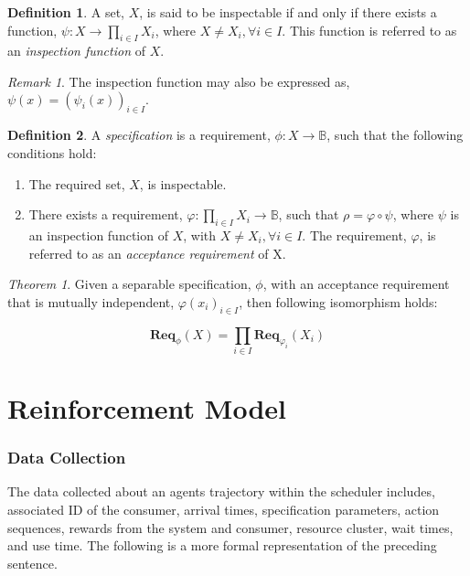 \documentclass{article}
\theoremstyle{definition}
\newtheorem{definition}{Definition}[section]
\theoremstyle{remark}
\newtheorem*{remark}{Remark}
\newtheorem*{theorem}{Theorem}
\newcommand{\func}[3]{#1:#2\rightarrow#3}
\newcommand{\reqfunc}[2]{#1:#2\rightarrow\mathbb{B}}
\newcommand{\reqop}[2]{\mathbf{Req}_{#1}(#2)}
\begin{document}
		\begin{definition}
			A set, $X$, is said to be inspectable if and only if there exists a function,
			$\func{\psi}{X}{\prod_{i \in I}{X_{i}}}$, where $X \ne X_{i}, \forall i \in I$. This function is referred to as an
			\emph{inspection function} of $X$.
		\end{definition}

		\begin{remark}
			The inspection function may also be expressed as, $\psi(x) = (\psi_{i}(x))_{i \in I}.$
		\end{remark}

		\begin{definition}
			A \emph{specification} is a requirement, $\reqfunc{\phi}{X}$, such that the following conditions
			hold:

			\begin{enumerate}
				\item The required set, $X$, is inspectable.

				\item There exists a requirement, $\reqfunc{\varphi}{\prod_{i \in I}{X_{i}}}$,
				such that $\rho = \varphi \circ \psi$, where $\psi$ is an inspection function of $X$,
				with $X \ne X_{i}, \forall i \in I$. The requirement, $\varphi$, is referred to as an
				\emph{acceptance requirement} of X.
			\end{enumerate}

		\end{definition}

		\begin{theorem}
			Given a separable specification, $\phi$, with an acceptance requirement that is mutually independent,
			$\varphi(x_i)_{i \in I}$, then following isomorphism holds:

			\[
			\reqop{\phi}{X} = \prod_{i \in I}\reqop{\varphi_{i}}{X_{i}}
			\]
		\end{theorem}

	\newpage

\part{Reinforcement Model}

	\section{Data Collection}

	The data collected about an agents trajectory within the scheduler includes, associated ID of the consumer, arrival
    times, specification parameters, action sequences, rewards from the system and consumer, resource cluster, wait
    times, and use time. The following is a more formal representation of the preceding sentence.
\end{document}
